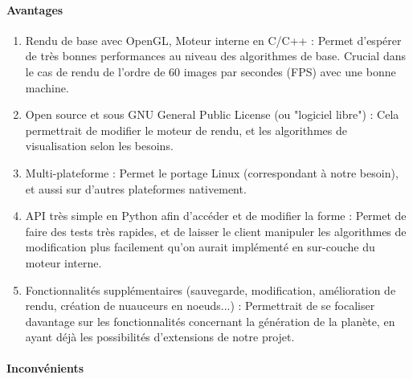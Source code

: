 \documentclass[a4paper]{article}
\begin{document}
\newpage
\paragraph{Avantages}

\begin{enumerate}
            \item {Rendu de base avec OpenGL, Moteur interne en C/C++ :}
            Permet d'espérer de très bonnes performances au niveau des algorithmes de base. Crucial dans le cas de rendu de l'ordre de 60 images par secondes (FPS) avec une bonne machine.
            
            \item {Open source et sous GNU General Public License (ou "logiciel libre") :}
            Cela permettrait de modifier le moteur de rendu, et les algorithmes de visualisation selon les besoins.
            
            \item {Multi-plateforme :}
            Permet le portage Linux (correspondant à notre besoin), et aussi sur d'autres plateformes nativement.
            
            \item {API très simple en Python afin d'accéder et de modifier la forme :}
            Permet de faire des tests très rapides, et de laisser le client manipuler les algorithmes de modification plus facilement qu'on aurait implémenté en sur-couche du moteur interne.
            
            \item {Fonctionnalités supplémentaires (sauvegarde, modification, amélioration de rendu, création de nuauceurs en noeuds...) :}
            Permettrait de se focaliser davantage sur les fonctionnalités concernant la génération de la planète, en ayant déjà les possibilités d'extensions de notre projet.
            
\end{enumerate}

\paragraph{Inconvénients}
\end{document}
